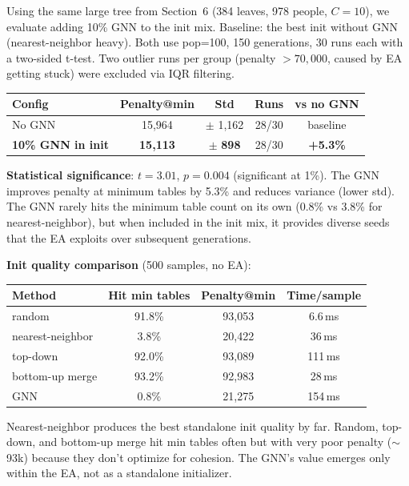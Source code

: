 \documentclass[11pt,a4paper]{article}
\begin{document}
Using the same large tree from Section~6 (384 leaves, 978 people, $C=10$), we evaluate adding 10\% GNN to the init mix.  Baseline: the best init without GNN (nearest-neighbor heavy).  Both use pop=100, 150 generations, 30 runs each with a two-sided t-test.  Two outlier runs per group (penalty $>70{,}000$, caused by EA getting stuck) were excluded via IQR filtering.

\begin{table}[H]
\centering
\begin{tabular}{lcccc}
\toprule
\textbf{Config} & \textbf{Penalty@min} & \textbf{Std} & \textbf{Runs} & \textbf{vs no GNN} \\
\midrule
No GNN & 15,964 & $\pm$ 1,162 & 28/30 & baseline \\
\textbf{10\% GNN in init} & \textbf{15,113} & $\pm$ \textbf{898} & 28/30 & \textbf{+5.3\%} \\
\bottomrule
\end{tabular}
\end{table}

\textbf{Statistical significance}: $t=3.01$, $p=0.004$ (significant at 1\%).  The GNN improves penalty at minimum tables by 5.3\% and reduces variance (lower std).  The GNN rarely hits the minimum table count on its own (0.8\% vs 3.8\% for nearest-neighbor), but when included in the init mix, it provides diverse seeds that the EA exploits over subsequent generations.

\textbf{Init quality comparison} (500 samples, no EA):
\begin{table}[H]
\centering
\begin{tabular}{lccc}
\toprule
\textbf{Method} & \textbf{Hit min tables} & \textbf{Penalty@min} & \textbf{Time/sample} \\
\midrule
random & 91.8\% & 93,053 & 6.6\,ms \\
nearest-neighbor & 3.8\% & 20,422 & 36\,ms \\
top-down & 92.0\% & 93,089 & 111\,ms \\
bottom-up merge & 93.2\% & 92,983 & 28\,ms \\
GNN & 0.8\% & 21,275 & 154\,ms \\
\bottomrule
\end{tabular}
\end{table}

Nearest-neighbor produces the best standalone init quality by far.  Random, top-down, and bottom-up merge hit min tables often but with very poor penalty ($\sim$93k) because they don't optimize for cohesion.  The GNN's value emerges only within the EA, not as a standalone initializer.
\end{document}
